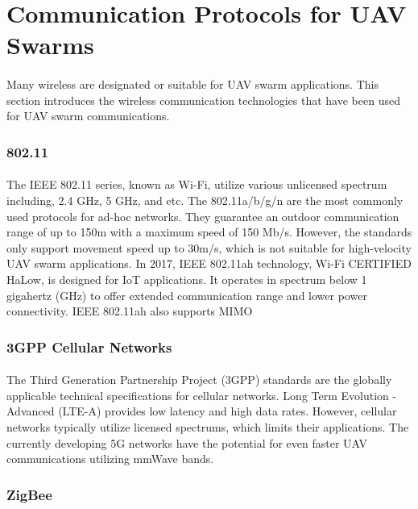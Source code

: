 \documentclass[a4paper,12pt]{report}
\begin{document}
\section{Communication Protocols for UAV Swarms}
\paragraph{}
Many wireless are designated or suitable for UAV swarm applications. This section introduces the wireless communication technologies that have been used for UAV swarm communications.

\subsubsection{802.11}
\paragraph{}
The IEEE 802.11 series, known as Wi-Fi, utilize various unlicensed spectrum including, 2.4 GHz, 5 GHz, and etc. The 802.11a/b/g/n are the most commonly used protocols for ad-hoc networks. They guarantee an outdoor communication range of up to 150m with a maximum speed of 150 Mb/s. However, the standards only support movement speed up to 30m/s, which is not suitable for high-velocity UAV swarm applications\cite{chen2020toward}. In 2017, IEEE 802.11ah technology, Wi-Fi CERTIFIED HaLow, is designed for IoT applications. It operates in spectrum below 1 gigahertz (GHz) to offer extended communication range and lower power connectivity. IEEE 802.11ah also supports MIMO\cite{Shi_2021}

\subsubsection{3GPP Cellular Networks}
\paragraph{}
The Third Generation Partnership Project (3GPP) standards are the globally applicable technical specifications for cellular networks. Long Term Evolution - Advanced (LTE-A) provides low latency and high data rates. However, cellular networks typically utilize licensed spectrums, which limits their applications\cite{chen2020toward}. The currently developing 5G networks have the potential for even faster UAV communications utilizing mmWave bands.

\subsubsection{ZigBee}
\end{document}
